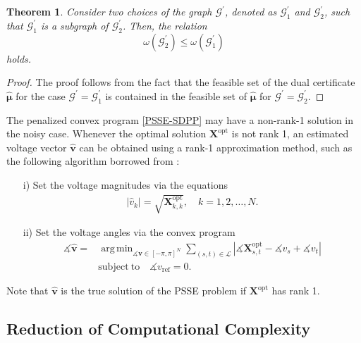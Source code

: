 \documentclass[journal,twoside]{IEEEtran}
\newtheorem{theorem}{Theorem}
\newcommand{\st}{\mathrm{subject~to}}
\newcommand{\bv}{\mathbf{v}}
\newcommand{\bX}{\mathbf{X}}
\newcommand{\cG}{{\mathcal G}}
\newcommand{\cL}{{\mathcal L}}
\DeclareMathOperator*{\argmin}{arg\,min}
\begin{document}
\begin{theorem}\label{thm:measurment} Consider two choices of the graph $\cG^{\prime}$, denoted as $\mathcal G^{\prime}_1$ and $\mathcal G^{\prime}_2$, such that $\mathcal G^{\prime}_1$ is a subgraph of $\mathcal G^{\prime}_2$. Then, the relation
\begin{equation}
\omega (\mathcal G^{\prime}_2)\leq \omega (\mathcal G^{\prime}_1)
\end{equation}
holds.
\end{theorem}
\begin{proof}
The proof follows from the fact that the feasible set of the dual certificate $\hat{\boldsymbol{\mu}}$ for the case  $\mathcal G^{\prime}=\mathcal G^{\prime}_1$ is contained in the feasible set  of $\hat{\boldsymbol{\mu}}$ for $\mathcal G^{\prime}=\mathcal G^{\prime}_2$.
\end{proof}

The penalized  convex program \eqref{PSSE-SDPP}  may have a non-rank-1 solution in the noisy case.
Whenever the optimal solution  $\bX^{\text{opt}}$ is not rank 1, an estimated voltage vector $\hat{\bv}$ can be obtained using a rank-1 approximation method, such as the following  algorithm borrowed from \cite{madani2014promises}:
\begin{itemize}
\item [i)] Set the voltage magnitudes via the equations
\begin{align}\label{anglerecovery}
|\hat{v}_k| = \sqrt{\bX_{k,k}^{\text{opt}}}, \quad k=1,2,\ldots,N.
\end{align}
\item [ii)] Set the voltage angles via the convex program
\begin{subequations}\label{magrecovery}
\begin{align}
\measuredangle \hat{\bv} = &\argmin_{\measuredangle \bv \in [-\pi, \pi]^N} \sum_{(s,t)\in \cL}
|\measuredangle \bX_{s,t}^{\text{opt}}- \measuredangle v_{s} + \measuredangle v_{t}| \\
&\st \quad \measuredangle v_{\text{ref}} = 0.
\end{align}
\end{subequations}
\end{itemize}
Note that  $\hat{\bv}$ is the true solution of the PSSE problem if   $\bX^{\text{opt}}$ has rank 1.

\subsection{Reduction of Computational Complexity}
\end{document}
